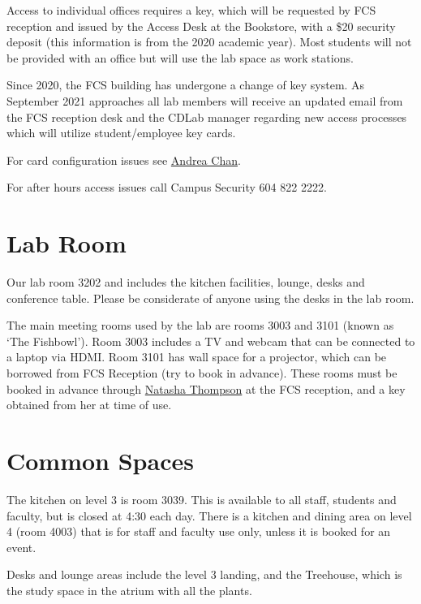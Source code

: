 \documentclass[
]{book}
\begin{document}
Access to individual offices requires a key, which will be requested by FCS reception and issued by the Access Desk at the Bookstore, with a \$20 security deposit (this information is from the 2020 academic year). Most students will not be provided with an office but will use the lab space as work stations.

Since 2020, the FCS building has undergone a change of key system. As September 2021 approaches all lab members will receive an updated email from the FCS reception desk and the CDLab manager regarding new access processes which will utilize student/employee key cards.

For card configuration issues see \protect\hyperlink{contacts}{Andrea Chan}.

For after hours access issues call Campus Security 604 822 2222.

\hypertarget{labroom}{%
\section*{Lab Room}\label{labroom}}

Our lab room 3202 and includes the kitchen facilities, lounge, desks and conference table. Please be considerate of anyone using the desks in the lab room.

The main meeting rooms used by the lab are rooms 3003 and 3101 (known as `The Fishbowl'). Room 3003 includes a TV and webcam that can be connected to a laptop via HDMI. Room 3101 has wall space for a projector, which can be borrowed from FCS Reception (try to book in advance). These rooms must be booked in advance through \protect\hyperlink{contacts}{Natasha Thompson} at the FCS reception, and a key obtained from her at time of use.

\hypertarget{commonspaces}{%
\section*{Common Spaces}\label{commonspaces}}

The kitchen on level 3 is room 3039. This is available to all staff, students and faculty, but is closed at 4:30 each day. There is a kitchen and dining area on level 4 (room 4003) that is for staff and faculty use only, unless it is booked for an event.

Desks and lounge areas include the level 3 landing, and the Treehouse, which is the study space in the atrium with all the plants.
\end{document}
